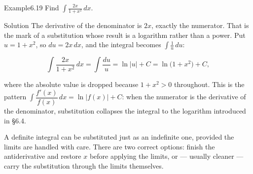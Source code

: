 \documentclass[a4paper,12pt,oneside]{memoir}
\begin{document}
\begin{workedexample}
\begin{envexample}{Example}{6.19}{}
Find \(\displaystyle\int \frac{2x}{1 + x^{2}}\,dx\).
\end{envexample}
\begin{envsolution}{Solution}{}{}
The derivative of the denominator is \(2x\), exactly the numerator. That is the mark of a substitution whose result is a logarithm rather than a power. Put \(u = 1 + x^{2}\), so \(du = 2x\,dx\), and the integral becomes \(\int \tfrac{1}{u}\,du\):

\[ \int \frac{2x}{1 + x^{2}}\,dx = \int \frac{du}{u} = \ln\lvert u\rvert + C = \ln\bigl(1 + x^{2}\bigr) + C, \]

where the absolute value is dropped because \(1 + x^{2} > 0\) throughout. This is the pattern \(\int \dfrac{f'(x)}{f(x)}\,dx = \ln\lvert f(x)\rvert + C\): when the numerator is the derivative of the denominator, substitution collapses the integral to the logarithm introduced in §6.4. \qedmark
\end{envsolution}
\end{workedexample}
A definite integral can be substituted just as an indefinite one, provided the limits are handled with care. There are two correct options: finish the antiderivative and restore \(x\) before applying the limits, or — usually cleaner — carry the substitution through the limits themselves.
\end{document}
